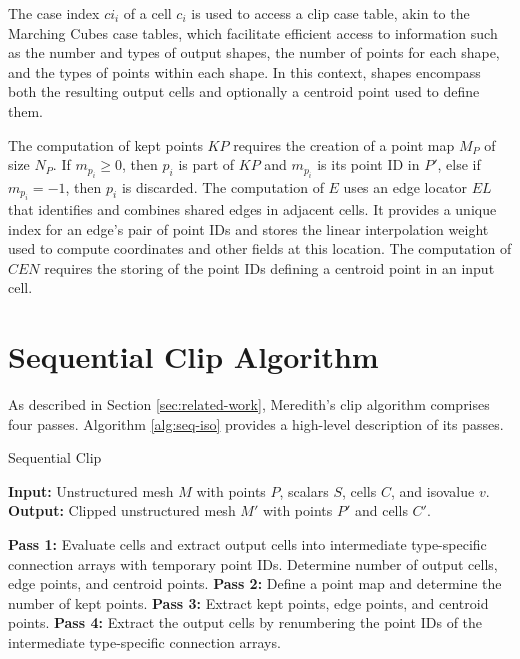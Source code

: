 \documentclass{egpubl}
\begin{document}
The case index $ci_i$ of a cell $c_i$ is used to access a clip case table, akin to the Marching Cubes case tables, which facilitate efficient access to information such as the number and types of output shapes, the number of points for each shape, and the types of points within each shape. In this context, shapes encompass both the resulting output cells and optionally a centroid point used to define them.

The computation of kept points $KP$ requires the creation of a point map $M_P$ of size $N_P$. If $m_{p_i} \geq 0$, then $p_i$ is part of $KP$ and $m_{p_i}$ is its point ID in $P'$, else if $m_{p_i} = -1$, then $p_i$ is discarded.  The computation of $E$ uses an edge locator $EL$ that identifies and combines shared edges in adjacent cells. It provides a unique index for an edge's pair of point IDs and stores the linear interpolation weight used to compute coordinates and other fields at this location. The computation of $CEN$ requires the storing of the point IDs defining a centroid point in an input cell.

\section{Sequential Clip Algorithm}
\label{sec:sequential-clip-algorithm}

As described in Section \ref{sec:related-work}, Meredith's clip algorithm comprises four passes. Algorithm \ref{alg:seq-iso} provides a high-level description of its passes.

\begin{algorithm}
\caption{Sequential Clip}
\label{alg:seq-iso}
\raggedright
\textbf{Input:} Unstructured mesh $M$ with points $P$, scalars $S$, cells $C$, and isovalue $v$.\\
\textbf{Output:} Clipped unstructured mesh $M'$ with points $P'$ and cells $C'$.
\begin{algorithmic}[1]
    \State \textbf{Pass 1:} Evaluate cells and extract output cells into intermediate type-specific connection arrays with temporary point IDs. Determine number of output cells, edge points, and centroid points.
    \State \textbf{Pass 2:} Define a point map and determine the number of kept points.
    \State \textbf{Pass 3:} Extract kept points, edge points, and centroid points.
    \State \textbf{Pass 4:} Extract the output cells by renumbering the point IDs of the intermediate type-specific connection arrays.
\end{algorithmic}
\end{algorithm}
\end{document}
